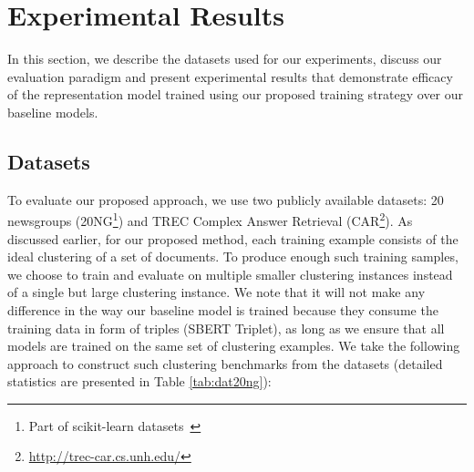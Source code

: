 \documentclass[11pt,a4paper]{article}
\begin{document}
\section{Experimental Results}
In this section, we describe the datasets used for our experiments, discuss our evaluation paradigm and present experimental results that demonstrate efficacy of the representation model trained using our proposed training strategy over our baseline models.

\subsection{Datasets} To evaluate our proposed approach, we use two publicly available datasets: 20 newsgroups (20NG\footnote{Part of scikit-learn datasets~\citet{scikit-learn}}) and TREC Complex Answer Retrieval (CAR\footnote{\url{http://trec-car.cs.unh.edu/}}). As discussed earlier, for our proposed method, each training example consists of the ideal clustering of a set of documents. To produce enough such training samples, we choose to train and evaluate on multiple smaller clustering instances instead of a single but large clustering instance. We note that it will not make any difference in the way our baseline model is trained because they consume the training data in form of triples (SBERT Triplet), as long as we ensure that all models are trained on the same set of clustering examples. We take the following approach to construct such clustering benchmarks from the datasets (detailed statistics are presented in Table \ref{tab:dat20ng}):
\end{document}
